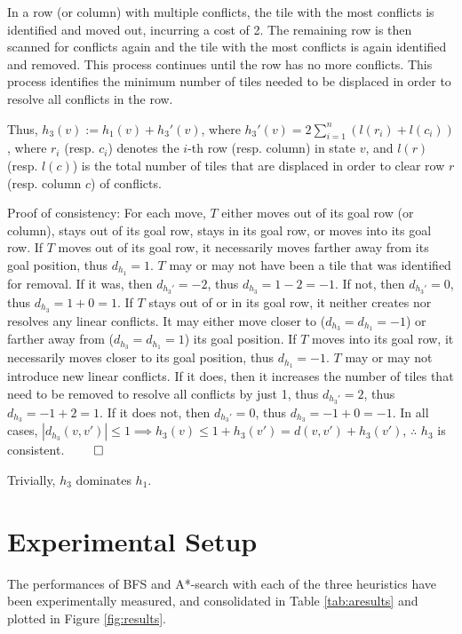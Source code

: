 \documentclass[runningheads]{llncs}
\begin{document}
In a row (or column) with multiple conflicts, the tile with the most conflicts is identified and moved out, incurring a cost of 2. The remaining row is then scanned for conflicts again and the tile with the most conflicts is again identified and removed. This process continues until the row has no more conflicts. This process identifies the minimum number of tiles needed to be displaced in order to resolve all conflicts in the row.

Thus, $h_3(v) := h_1(v) + h_3'(v)$, where $h_3'(v) = 2 \sum_{i=1}^n (l(r_i) + l(c_i))$, where $r_i$ (resp. $c_i$) denotes the $i$-th row (resp. column) in state $v$, and $l(r)$ (resp. $l(c)$) is the total number of tiles that are displaced in order to clear row $r$ (resp. column $c$) of conflicts.

Proof of consistency:
For each move, $T$ either moves out of its goal row (or column), stays out of its goal row, stays in its goal row, or moves into its goal row.
If $T$ moves out of its goal row, it necessarily moves farther away from its goal position, thus $d_{h_1} = 1$. $T$ may or may not have been a tile that was identified for removal. If it was, then $d_{h_3'} = -2$, thus $d_{h_3} = 1-2 = -1$. If not, then $d_{h_3'} = 0$, thus $d_{h_3} = 1+0 = 1$.
If $T$ stays out of or in its goal row, it neither creates nor resolves any linear conflicts. It may either move closer to ($d_{h_3} = d_{h_1} = -1$) or farther away from ($d_{h_3} = d_{h_1} = 1$) its goal position.
If $T$ moves into its goal row, it necessarily moves closer to its goal position, thus $d_{h_1} = -1$. $T$ may or may not introduce new linear conflicts. If it does, then it increases the number of tiles that need to be removed to resolve all conflicts by just 1, thus $d_{h_3'} = 2$, thus $d_{h_3} = -1+2 = 1$. If it does not, then $d_{h_3'} = 0$, thus $d_{h_3} = -1+0 = -1$.
In all cases, $|d_{h_3}(v,v')|\leq 1 \implies h_3(v) \leq 1+h_3(v') = d(v,v')+h_3(v')$, $\therefore$ $h_3$ is consistent. $\qed$


Trivially, $h_3$ dominates $h_1$.



\section{Experimental Setup}

The performances of BFS and A*-search with each of the three heuristics have been experimentally measured, and consolidated in Table \ref{tab:aresults} and plotted in Figure \ref{fig:results}.
\end{document}
